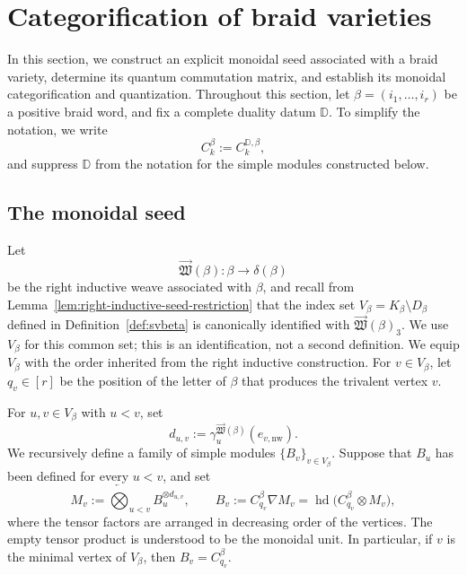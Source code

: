 \documentclass[12pt, reqno]{amsart}
\theoremstyle{plain}
\theoremstyle{definition}
\numberwithin{equation}{section}
\newcommand{\DD}{\mathbb{D}}
\begin{document}
\section{Categorification of braid varieties}
\label{sec:categorification-braid-varieties}
In this section, we construct an explicit monoidal seed associated
with a braid variety, determine its quantum commutation matrix, and
establish its monoidal categorification and quantization.
Throughout this section, let
\(\beta=(i_1,\ldots,i_r)\) be a positive braid word, and fix a
complete duality datum \(\DD\). To simplify the notation, we write
\begin{equation*}
    C_k^\beta:=C_k^{\DD,\beta},
\end{equation*}
and suppress \(\DD\) from the notation for the simple modules
constructed below.

\subsection{The monoidal seed}

Let
\begin{equation*}
    \overrightarrow{\mathfrak W}(\beta)
    \colon
    \beta\longrightarrow\delta(\beta)
\end{equation*}
be the right inductive weave associated with \(\beta\), and
recall from Lemma~\ref{lem:right-inductive-seed-restriction} that the
index set \(V_\beta=K_\beta\setminus D_\beta\) defined in
Definition~\ref{def:svbeta} is canonically identified with
\(\overrightarrow{\mathfrak W}(\beta)_3\). We use \(V_\beta\) for
this common set; this is an identification, not a second definition.
We equip \(V_\beta\) with the order inherited from the right inductive
construction. For \(v\in V_\beta\), let \(q_v\in[r]\) be the position
of the letter of \(\beta\) that produces the trivalent vertex \(v\).

For \(u,v\in V_\beta\) with \(u<v\), set
\begin{equation}\label{eq:duv-Lusztig-cycle}
    d_{u,v}
    :=
    \gamma_u^{\overrightarrow{\mathfrak W}(\beta)}
    (e_{v,\mathrm{nw}}).
\end{equation}
We recursively define a family of simple modules
\(\{B_v\}_{v\in V_\beta}\). Suppose that \(B_u\) has been defined for
every \(u<v\), and set
\begin{equation}\label{eq:Mv-Bv-definition}
    M_v
    :=
    \overleftarrow{\bigotimes}_{u<v}
    B_u^{\otimes d_{u,v}},
    \qquad
    B_v
    :=
    C_{q_v}^\beta\nabla M_v
    =
    \operatorname{hd}
    \bigl(C_{q_v}^\beta\otimes M_v\bigr),
\end{equation}
where the tensor factors are arranged in decreasing order of the
vertices. The empty tensor product is understood to be the monoidal
unit. In particular, if \(v\) is the minimal vertex of \(V_\beta\),
then \(B_v=C_{q_v}^\beta\).
\end{document}
